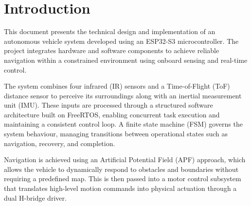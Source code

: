 \chapter{Introduction}


This document presents the technical design and implementation of an autonomous vehicle system developed using an ESP32-S3 microcontroller. The project integrates hardware and software components to achieve reliable navigation within a constrained environment using onboard sensing and real-time control.

The system combines four infrared (IR) sensors and a Time-of-Flight (ToF) distance sensor to perceive its surroundings along with an inertial measurement unit (IMU). These inputs are processed through a structured software architecture built on FreeRTOS, enabling concurrent task execution and maintaining a consistent control loop. A finite state machine (FSM) governs the system behaviour, managing transitions between operational states such as navigation, recovery, and completion.

Navigation is achieved using an Artificial Potential Field (APF) approach, which allows the vehicle to dynamically respond to obstacles and boundaries without requiring a predefined map. This is then passed into a motor control subsystem that translates high-level motion commands into physical actuation through a dual H-bridge driver.